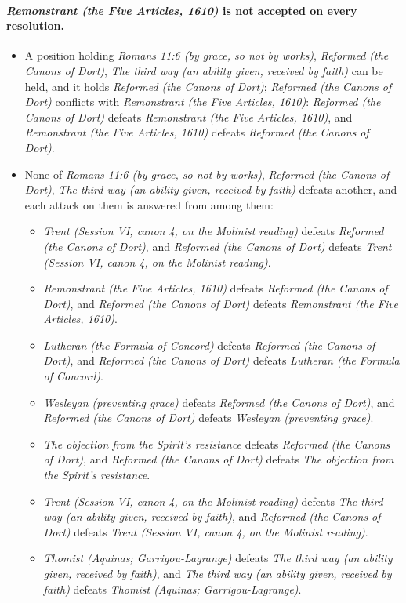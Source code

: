 \documentclass[11pt]{article}
\begin{document}
\paragraph{\emph{Remonstrant (the Five Articles, 1610)} is not accepted on every resolution.}
\begin{itemize}
\item A position holding \emph{Romans 11:6 (by grace, so not by works)}, \emph{Reformed (the Canons of Dort)}, \emph{The third way (an ability given, received by faith)} can be held, and it holds \emph{Reformed (the Canons of Dort)}; \emph{Reformed (the Canons of Dort)} conflicts with \emph{Remonstrant (the Five Articles, 1610)}: \emph{Reformed (the Canons of Dort)} defeats \emph{Remonstrant (the Five Articles, 1610)}, and \emph{Remonstrant (the Five Articles, 1610)} defeats \emph{Reformed (the Canons of Dort)}.
\item None of \emph{Romans 11:6 (by grace, so not by works)}, \emph{Reformed (the Canons of Dort)}, \emph{The third way (an ability given, received by faith)} defeats another, and each attack on them is answered from among them:
\begin{itemize}
\item \emph{Trent (Session VI, canon 4, on the Molinist reading)} defeats \emph{Reformed (the Canons of Dort)}, and \emph{Reformed (the Canons of Dort)} defeats \emph{Trent (Session VI, canon 4, on the Molinist reading)}.
\item \emph{Remonstrant (the Five Articles, 1610)} defeats \emph{Reformed (the Canons of Dort)}, and \emph{Reformed (the Canons of Dort)} defeats \emph{Remonstrant (the Five Articles, 1610)}.
\item \emph{Lutheran (the Formula of Concord)} defeats \emph{Reformed (the Canons of Dort)}, and \emph{Reformed (the Canons of Dort)} defeats \emph{Lutheran (the Formula of Concord)}.
\item \emph{Wesleyan (preventing grace)} defeats \emph{Reformed (the Canons of Dort)}, and \emph{Reformed (the Canons of Dort)} defeats \emph{Wesleyan (preventing grace)}.
\item \emph{The objection from the Spirit’s resistance} defeats \emph{Reformed (the Canons of Dort)}, and \emph{Reformed (the Canons of Dort)} defeats \emph{The objection from the Spirit’s resistance}.
\item \emph{Trent (Session VI, canon 4, on the Molinist reading)} defeats \emph{The third way (an ability given, received by faith)}, and \emph{Reformed (the Canons of Dort)} defeats \emph{Trent (Session VI, canon 4, on the Molinist reading)}.
\item \emph{Thomist (Aquinas; Garrigou-Lagrange)} defeats \emph{The third way (an ability given, received by faith)}, and \emph{The third way (an ability given, received by faith)} defeats \emph{Thomist (Aquinas; Garrigou-Lagrange)}.
\end{itemize}
\end{itemize}
\end{document}
